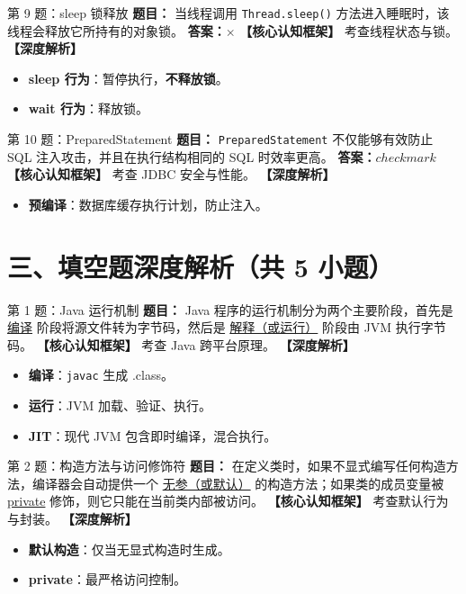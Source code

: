 ﻿\documentclass[12pt, a4paper]{ctexart}
\begin{document}
\begin{bluebox}{第 9 题：sleep 锁释放}
	\textbf{题目：} 当线程调用 \texttt{Thread.sleep()} 方法进入睡眠时，该线程会释放它所持有的对象锁。
	\textbf{答案：$\times$}
	\textbf{【核心认知框架】} 考查线程状态与锁。
	\textbf{【深度解析】}
	\begin{itemize}[leftmargin=*, nosep]
		\item \textbf{sleep 行为}：暂停执行，\textbf{不释放锁}。
		\item \textbf{wait 行为}：释放锁。
	\end{itemize}
\end{bluebox}

\begin{bluebox}{第 10 题：PreparedStatement}
	\textbf{题目：} \texttt{PreparedStatement} 不仅能够有效防止 SQL 注入攻击，并且在执行结构相同的 SQL 时效率更高。
	\textbf{答案：$checkmark$}
	\textbf{【核心认知框架】} 考查 JDBC 安全与性能。
	\textbf{【深度解析】}
	\begin{itemize}[leftmargin=*, nosep]
		\item \textbf{预编译}：数据库缓存执行计划，防止注入。
	\end{itemize}
\end{bluebox}

\section{三、填空题深度解析（共 5 小题）}

\begin{bluebox}{第 1 题：Java 运行机制}
	\textbf{题目：} Java 程序的运行机制分为两个主要阶段，首先是 \underline{编译} 阶段将源文件转为字节码，然后是 \underline{解释（或运行）} 阶段由 JVM 执行字节码。
	\textbf{【核心认知框架】} 考查 Java 跨平台原理。
	\textbf{【深度解析】}
	\begin{itemize}[leftmargin=*, nosep]
		\item \textbf{编译}：\texttt{javac} 生成 .class。
		\item \textbf{运行}：JVM 加载、验证、执行。
		\item \textbf{JIT}：现代 JVM 包含即时编译，混合执行。
	\end{itemize}
\end{bluebox}

\begin{bluebox}{第 2 题：构造方法与访问修饰符}
	\textbf{题目：} 在定义类时，如果不显式编写任何构造方法，编译器会自动提供一个 \underline{无参（或默认）} 的构造方法；如果类的成员变量被 \underline{private} 修饰，则它只能在当前类内部被访问。
	\textbf{【核心认知框架】} 考查默认行为与封装。
	\textbf{【深度解析】}
	\begin{itemize}[leftmargin=*, nosep]
		\item \textbf{默认构造}：仅当无显式构造时生成。
		\item \textbf{private}：最严格访问控制。
	\end{itemize}
\end{bluebox}
\end{document}
